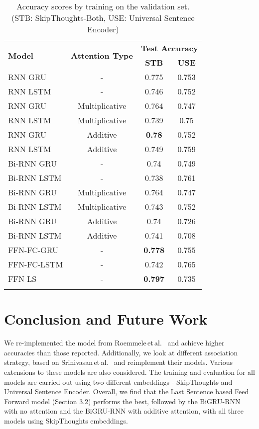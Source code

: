 \documentclass{article}
\begin{document}
\begin{table}[btp]
\vspace{20pt}
\begin{tabular}{lccc}
\toprule

\multirow{2}{*}{\textbf{Model}} & 
\multirow{2}{*}{\textbf{Attention Type}} &
\multicolumn{2}{c}{\textbf{Test Accuracy}} \\
& & {\textbf{STB}} & {\textbf{USE}} \\
\midrule

RNN GRU & - & 0.775 & 0.753 \\
RNN LSTM & - & 0.746 & 0.752\\

\midrule

RNN GRU & Multiplicative & 0.764 & 0.747 \\
RNN LSTM & Multiplicative & 0.739 & 0.75 \\
RNN GRU & Additive & \textbf{0.78} & 0.752 \\
RNN LSTM & Additive & 0.749 & 0.759 \\
\midrule

Bi-RNN GRU & - &  0.74 & 0.749 \\
Bi-RNN LSTM & - &  0.738 & 0.761 \\
Bi-RNN GRU & Multiplicative & 0.764 & 0.747 \\
Bi-RNN LSTM & Multiplicative & 0.743 & 0.752 \\
Bi-RNN GRU & Additive & 0.74 & 0.726\\
Bi-RNN LSTM & Additive &  0.741 & 0.708 \\
\midrule

FFN-FC-GRU & - & \textbf{0.778} & 0.755\\
FFN-FC-LSTM & - & 0.742 & 0.765\\
FFN LS & - & \textbf{0.797} & 0.735 \\

\bottomrule
\vspace{1pt}
\end{tabular}
\captionsetup{justification=centering}
\caption{Accuracy scores by training on the validation set. \\
(STB: SkipThoughts-Both, USE: Universal Sentence Encoder)}
\end{table}

\section{Conclusion and Future Work}
We re-implemented the model from Roemmele\,et\,al.\ \citep{Roemmele2017AnTest} and achieve higher accuracies than those reported. Additionally, we look at different association strategy, based on Srinivasan\,et\,al.\ \citep{Srinivasan2018ATest} and reimplement their models. Various extensions to these models are also considered. The training and evaluation for all models are carried out using two different embeddings - SkipThoughts and Universal Sentence Encoder. Overall, we find that the Last Sentence based Feed Forward model (Section 3.2) performs the best, followed by the BiGRU-RNN with no attention and the BiGRU-RNN with additive attention, with all three models using SkipThoughts embeddings. 
\end{document}
